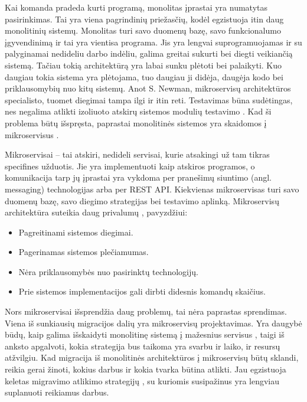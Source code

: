 \documentclass{VUMIFPSbakalaurinis}
\begin{document}
\tableofcontents

Kai komanda pradeda kurti programą, monolitas įprastai yra numatytas pasirinkimas. Tai yra viena pagrindinių priežasčių, kodėl egzistuoja itin daug monolitinių sistemų. Monolitas turi savo duomenų bazę, savo funkcionalumo įgyvendinimą ir tai yra vientisa programa. Jis yra lengvai suprogramuojamas ir su palyginamai nedideliu darbo indėliu, galima greitai sukurti bei diegti veikiančią sistemą. Tačiau tokią architektūrą yra labai sunku plėtoti bei palaikyti. Kuo daugiau  tokia sistema yra plėtojama, tuo daugiau ji didėja, daugėja kodo bei priklausomybių nuo kitų sistemų. Anot S. Newman, mikroservisų architektūros specialisto, tuomet diegimai tampa ilgi ir itin reti. Testavimas būna sudėtingas, nes negalima atlikti izoliuoto atskirų sistemos modulių testavimo \cite{New19}. Kad ši problema būtų išspręsta, paprastai monolitinės sistemos yra skaidomos į mikroservisus \cite{DK}.

Mikroservisai – tai atskiri, nedideli servisai, kurie atsakingi už tam tikras specifines užduotis. Jie yra implementuoti kaip atskiros programos, o komunikacija tarp jų įprastai yra vykdoma per pranešimų siuntimo (angl. messaging) technologijas arba per REST API. Kiekvienas mikroservisas turi savo duomenų bazę, savo diegimo strategijas bei testavimo aplinką. Mikroservisų architektūra suteikia daug privalumų \cite{FBZ+19}, pavyzdžiui:
\begin{itemize}
    \item Pagreitinami sistemos diegimai.
    \item Pagerinamas sistemos plečiamumas.
    \item Nėra priklausomybės nuo pasirinktų technologijų.
    \item Prie sistemos implementacijos gali dirbti didesnis komandų skaičius.
\end{itemize}

Nors mikroservisai išsprendžia daug problemų, tai nėra paprastas sprendimas. Viena iš sunkiausių migracijos dalių yra mikroservisų projektavimas. Yra daugybė būdų, kaip galima išskaidyti monolitinę sistemą į mažesnius servisus \cite{FBZ+19}, taigi iš anksto apgalvoti, kokia strategija bus taikoma yra svarbu ir laiko, ir resursų atžvilgiu. Kad migracija iš monolitinės architektūros į mikroservisų būtų sklandi, reikia gerai žinoti, kokius darbus ir kokia tvarka būtina atlikti. Jau egzistuoja keletas migravimo atlikimo strategijų \cite{Wal22,MQO18,KXL+20}, su kuriomis susipažinus yra lengviau suplanuoti reikiamus darbus. 
\end{document}
